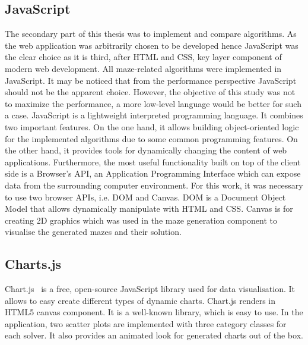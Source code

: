 \subsection{JavaScript}
The secondary part of this thesis was to implement and compare algorithms. As the web application was arbitrarily chosen to be developed hence JavaScript was the 
clear choice as it is third, after HTML and CSS, key layer component of modern web development. All maze-related algorithms were implemented in JavaScript.
It may be noticed that from the performance perspective JavaScript should not be the apparent choice. However, the objective of this study was not to maximize
the performance, a more low-level language would be better for such a case. JavaScript is a lightweight interpreted programming language. 
It combines two important features. On the one hand, it allows building object-oriented logic for the implemented algorithms due to some common programming
features. On the other hand, it provides tools for dynamically changing the content of web applications\cite{29}. Furthermore, the most useful functionality built on top
of the client side is a Browser's API, an Application Programming Interface which can expose data from the surrounding computer environment. For this work, it was necessary to use two browser APIs, i.e. DOM and Canvas. DOM is a Document Object Model that allows dynamically manipulate with HTML and CSS.
Canvas is for creating 2D graphics which was used in the maze generation component to visualise the generated mazes and their solution. 
\subsection{Charts.js}
Chart.js~\cite{30} is a free, open-source JavaScript library used for data visualisation. It allows to easy create different types of dynamic charts. Chart.js renders in 
HTML5 canvas component. It is a well-known library, which is easy to use. In the application, two scatter plots are implemented with three category classes 
for each solver. It also provides an animated look for generated charts out of the box.
